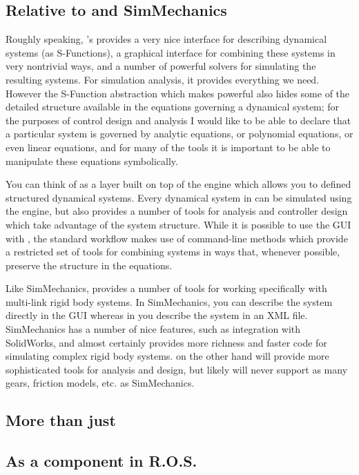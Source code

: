 \subsection{Relative to \simulink and SimMechanics}

Roughly speaking, \matlab's \simulink provides a very nice interface for describing dynamical systems (as S-Functions), a graphical interface for combining these systems in very nontrivial ways, and a number of powerful solvers for simulating the resulting systems.  For simulation analysis, it provides everything we need.   However the S-Function abstraction which makes \simulink powerful also hides some of the detailed structure available in the equations governing a dynamical system; for the purposes of control design and analysis I would like to be able to declare that a particular system is governed by analytic equations, or polynomial equations, or even linear equations, and for many of the tools it is important to be able to manipulate these equations symbolically.   

You can think of \drake as a layer built on top of the \simulink engine which allows you to defined structured dynamical systems.  Every dynamical system in \drake can be simulated using the \simulink engine, but \drake also provides a number of tools for analysis and controller design which take advantage of the system structure.  While it is possible to use the \simulink GUI with \drake, the standard workflow makes use of command-line methods which provide a restricted set of tools for combining systems in ways that, whenever possible, preserve the structure in the equations.  

Like SimMechanics, \drake provides a number of tools for working specifically with multi-link rigid body systems.  In SimMechanics, you can describe the system directly in the GUI whereas in \drake you describe the system in an XML file.  SimMechanics has a number of nice features, such as integration with SolidWorks, and almost certainly provides more richness and faster code for simulating complex rigid body systems.  \drake on the other hand will provide more sophisticated tools for analysis and design, but likely will never support as many gears, friction models, etc. as SimMechanics.  

\subsection{More than just \matlab}

\subsection{As a component in R.O.S.}

